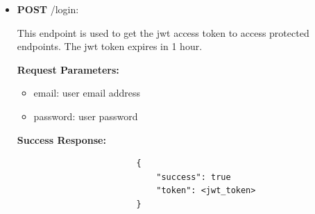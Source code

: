 \documentclass{article}
\begin{document}
\begin{itemize}
             \item \textbf{POST} /login:
                \begin{addmargin}[1em]{2em}%
                    This endpoint is used to get the jwt access token to access protected endpoints. The jwt token expires in 1 hour.
                    \par\textbf{Request Parameters:}
                    \begin{itemize}
                        \item email: user email address
                        \item password: user password
                    \end{itemize}
                    \par\textbf{Success Response:}
                    \begin{listing}[H]
                    \begin{verbatim}
                        {     
                            "success": true
                            "token": <jwt_token>
                        }
                    \end{verbatim}
                    \end{listing}
                \end{addmargin}


\end{itemize}
\end{document}
